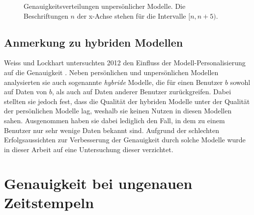 \begin{figure}[h]
	\centering
	\caption[Genauigkeitsverteilungen unpersönlicher Modelle]{Genauigkeitsverteilungen unpersönlicher Modelle. Die Beschriftungen $n$ der x-Achse stehen für die Intervalle $[n, n+5)$. }
	\label{fig:accuracy-impersonal-per-user}
\end{figure}

\subsection{Anmerkung zu hybriden Modellen}
Weiss und Lockhart untersuchten 2012 den Einfluss der Modell-Personalisierung auf die Genauigkeit \cite{Weiss2012}. Neben persönlichen und unpersönlichen Modellen analysierten sie auch sogenannte \textit{hybride} Modelle, die für einen Benutzer $b$ sowohl auf Daten von $b$, als auch auf Daten anderer Benutzer zurückgreifen. Dabei stellten sie jedoch fest, dass die Qualität der hybriden Modelle unter der Qualität der persönlichen Modelle lag, weshalb sie keinen Nutzen in diesen Modellen sahen. Ausgenommen haben sie dabei lediglich den Fall, in dem zu einem Benutzer nur sehr wenige Daten bekannt sind. Aufgrund der schlechten Erfolgsaussichten zur Verbesserung der Genauigkeit durch solche Modelle wurde in dieser Arbeit auf eine Untersuchung dieser verzichtet.

\section{Genauigkeit bei ungenauen Zeitstempeln}

